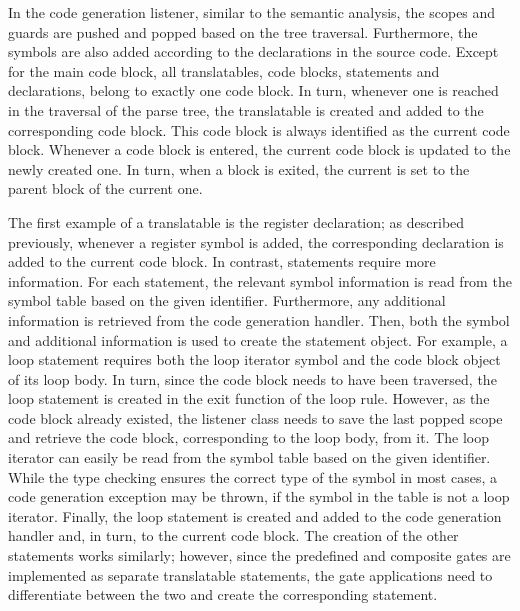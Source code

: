 In the code generation listener, similar to the semantic analysis, the scopes and guards are pushed and popped based on the tree traversal. Furthermore, the symbols are also added according to the declarations in the source code. Except for the main code block, all translatables, \ie code blocks, statements and declarations, belong to exactly one code block. In turn, whenever one is reached in the traversal of the parse tree, the translatable is created and added to the corresponding code block. This code block is always identified as the current code block. Whenever a code block is entered, the current code block is updated to the newly created one. In turn, when a block is exited, the current is set to the parent block of the current one.

The first example of a translatable is the register declaration; as described previously, whenever a register symbol is added, the corresponding declaration is added to the current code block. In contrast, statements require more information. For each statement, the relevant symbol information is read from the symbol table based on the given identifier. Furthermore, any additional information is retrieved from the code generation handler. Then, both the symbol and additional information is used to create the statement object. For example, a loop statement requires both the loop iterator symbol and the code block object of its loop body. In turn, since the code block needs to have been traversed, the loop statement is created in the exit function of the loop rule. However, as the code block already existed, the listener class needs to save the last popped scope and retrieve the code block, corresponding to the loop body, from it. The loop iterator can easily be read from the symbol table based on the given identifier. While the type checking ensures the correct type of the symbol in most cases, a code generation exception may be thrown, if the symbol in the table is not a loop iterator. Finally, the loop statement is created and added to the code generation handler and, in turn, to the current code block. The creation of the other statements works similarly; however, since the predefined and composite gates are implemented as separate translatable statements, the gate applications need to differentiate between the two and create the corresponding statement.

